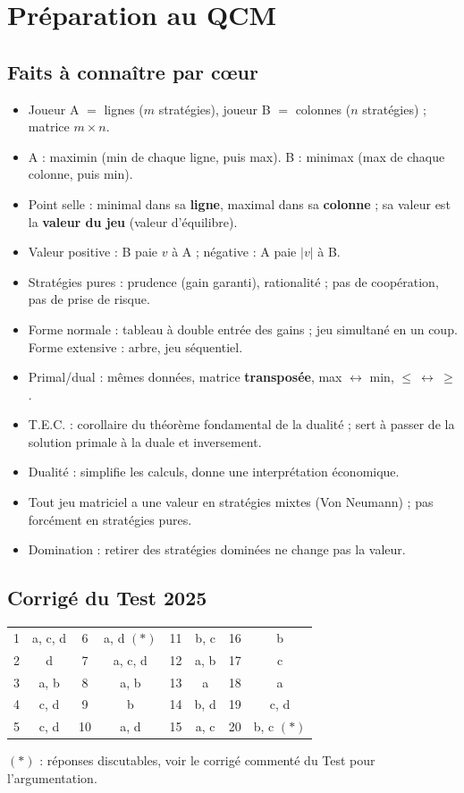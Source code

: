 \documentclass[11pt,a4paper]{article}
\begin{document}
\section{Préparation au QCM}\label{sec:qcm}
\subsection{Faits à connaître par cœur}
\begin{itemize}
\item Joueur A $=$ lignes ($m$ stratégies), joueur B $=$ colonnes ($n$ stratégies) ; matrice $m\times n$.
\item A : maximin (min de chaque ligne, puis max). B : minimax (max de chaque colonne, puis min).
\item Point selle : minimal dans sa \textbf{ligne}, maximal dans sa \textbf{colonne} ; sa valeur est la \textbf{valeur du jeu} (valeur d'équilibre).
\item Valeur positive : B paie $v$ à A ; négative : A paie $|v|$ à B.
\item Stratégies pures : prudence (gain garanti), rationalité ; pas de coopération, pas de prise de risque.
\item Forme normale : tableau à double entrée des gains ; jeu simultané en un coup. Forme extensive : arbre, jeu séquentiel.
\item Primal/dual : mêmes données, matrice \textbf{transposée}, max $\leftrightarrow$ min, $\le\ \leftrightarrow\ \ge$.
\item T.E.C. : corollaire du théorème fondamental de la dualité ; sert à passer de la solution primale à la duale et inversement.
\item Dualité : simplifie les calculs, donne une interprétation économique.
\item Tout jeu matriciel a une valeur en stratégies mixtes (Von Neumann) ; pas forcément en stratégies pures.
\item Domination : retirer des stratégies dominées ne change pas la valeur.
\end{itemize}

\subsection{Corrigé du Test 2025}
\begin{center}
\renewcommand{\arraystretch}{1.2}
\begin{tabular}{|c|c||c|c||c|c||c|c|}
\hline
1 & a, c, d & 6 & a, d $(\ast)$ & 11 & b, c & 16 & b\\
2 & d & 7 & a, c, d & 12 & a, b & 17 & c\\
3 & a, b & 8 & a, b & 13 & a & 18 & a\\
4 & c, d & 9 & b & 14 & b, d & 19 & c, d\\
5 & c, d & 10 & a, d & 15 & a, c & 20 & b, c $(\ast)$\\\hline
\end{tabular}
\end{center}
$(\ast)$ : réponses discutables, voir le corrigé commenté du Test pour l'argumentation.
\end{document}

